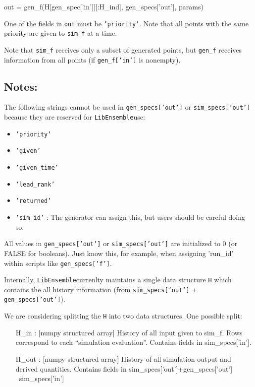\documentclass{article}
\newenvironment{allintypewriter}{\ttfamily}{\par}
\newcommand{\libE}{\texttt{LibEnsemble}}
\begin{document}
\begin{allintypewriter}
  out = gen\_f(H[gen\_spec['in']][:H\_ind], gen\_specs['out'], params)\\
\end{allintypewriter}

One of the fields in \texttt{out} must be \texttt{'priority'}. Note that all
points with the same priority are given to \texttt{sim\_f} at a time.

Note that \texttt{sim\_f} receives only a subset of generated points, but
\texttt{gen\_f} receives information from all points (if \texttt{gen\_f['in']}
is nonempty).

\subsection{Notes:}
The following strings cannot be used in  \texttt{gen\_specs['out']} or
\texttt{sim\_specs['out']} because they are reserved for \libE use:
\begin{itemize}
  \item \texttt{'priority'}
  \item \texttt{'given'}
  \item \texttt{'given\_time'}
  \item \texttt{'lead\_rank'}
  \item \texttt{'returned'}
  \item \texttt{'sim\_id'} : The generator can assign this, but users should be
    careful doing so.
\end{itemize}

All values in \texttt{gen\_specs['out']} or \texttt{sim\_specs['out']} are
initialized to 0 (or FALSE for booleans). Just know this, for example, when
assigning 'run\_id' within scripts like \texttt{gen\_specs['f']}.

Internally, \libE currenlty maintains a single data structure \texttt{H} which
contains the all history information (from \texttt{sim\_specs['out'] +
gen\_specs['out']}). 

We are considering splitting the \texttt{H} into two data structures. One possible split:

\begin{allintypewriter}
  \begin{itemize}
    \item[H\_in]: [numpy structured array] History of all input given to
      sim\_f. Rows correspond to each ``simulation evaluation''. Contains fields
      in sim\_specs['in']. 
      
    \item[H\_out]: [numpy structured array] History of all simulation output
      and derived quantities. Contains fields in sim\_specs['out']+gen\_specs['out'] \ sim\_specs['in']
  \end{itemize}
\end{allintypewriter}
\end{document}
